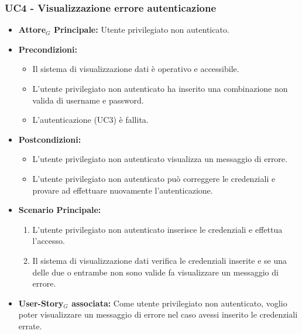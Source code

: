 \documentclass[11pt]{article}
\begin{document}
\begin{justify}
\subsubsection{\textbf{UC4 - Visualizzazione errore autenticazione}}
\begin{itemize}
    \item \textbf{Attore$_G$ Principale:} Utente privilegiato non autenticato.
    \item \textbf{Precondizioni:}
        \begin{itemize}
            \item Il sistema di visualizzazione dati è operativo e accessibile.
            \item L'utente privilegiato non autenticato ha inserito una combinazione non valida di username e password.
            \item L'autenticazione (UC3) è fallita.
        \end{itemize}
    \item \textbf{Postcondizioni:}
        \begin{itemize}
            \item L’utente privilegiato non autenticato visualizza un messaggio di errore.
            \item L’utente privilegiato non autenticato può correggere le credenziali e provare ad effettuare nuovamente l'autenticazione.
        \end{itemize}
    \item \textbf{Scenario Principale:}
        \begin{enumerate}
            \item L'utente privilegiato non autenticato inserisce le credenziali e effettua l'accesso.
            \item Il sistema di visualizzazione dati verifica le credenziali inserite e se una delle due o entrambe non sono valide fa visualizzare un messaggio di errore.
        \end{enumerate}
    \item \textbf{User-Story$_G$ associata:} Come utente privilegiato non autenticato, voglio poter visualizzare un messaggio di errore nel caso avessi inserito le credenziali errate.
\end{itemize}

\end{justify}
\end{document}

